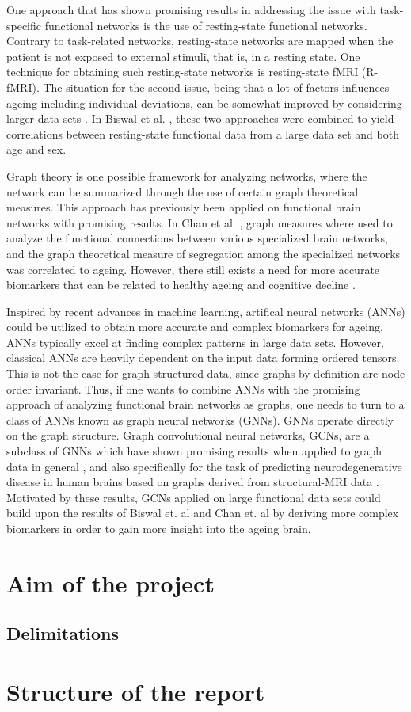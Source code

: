 One approach that has shown promising results in addressing the issue with task-specific functional networks is the use of resting-state functional networks. Contrary to task-related networks, resting-state networks are mapped when the patient is not exposed to external stimuli, that is, in a resting state. One technique for obtaining such resting-state networks is resting-state fMRI (R-fMRI). The situation for the second issue, being that a lot of factors influences ageing including individual deviations, can be somewhat improved by considering larger data sets \cite{grady}. In Biswal et al. \cite{biswal}, these two approaches were combined to yield correlations between resting-state functional data from a large data set and both age and sex. 

Graph theory is one possible framework for analyzing networks, where the network can be summarized through the use of certain graph theoretical measures. This approach has previously been applied on functional brain networks with promising results. In Chan et al. \cite{chan}, graph measures where used to analyze the functional connections between various specialized brain networks, and the graph theoretical measure of segregation among the specialized networks was correlated to ageing. However, there still exists a need for more accurate biomarkers that can be related to healthy ageing and cognitive decline \cite{multiplex}. 

Inspired by recent advances in machine learning, artifical neural networks (ANNs) could be utilized to obtain more accurate and complex biomarkers for ageing. ANNs typically excel at finding complex patterns in large data sets. However, classical ANNs are heavily dependent on the input data forming ordered tensors. This is not the case for graph structured data, since graphs by definition are node order invariant. Thus, if one wants to combine ANNs with the promising approach of analyzing functional brain networks as graphs, one needs to turn to a class of ANNs known as graph neural networks (GNNs). GNNs operate directly on the graph structure. Graph convolutional neural networks, GCNs, are a subclass of GNNs which have shown promising results when applied to graph data in general \cite{kipf_semi_supervised} \cite{kipf_vae} \cite{wu_review}, and also specifically for the task of predicting neurodegenerative disease in human brains based on graphs derived from structural-MRI data \cite{jansson_sandstrom}. Motivated by these results, GCNs applied on large functional data sets could build upon the results of Biswal et. al \cite{biswal} and Chan et. al \cite{chan} by deriving more complex biomarkers in order to gain more insight into the ageing brain. 

\section{Aim of the project}

\subsection{Delimitations}

\section{Structure of the report}

